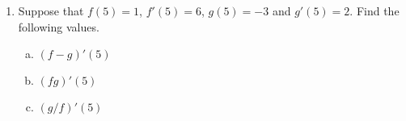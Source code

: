 \documentclass[11pt,fleqn]{article}
\begin{document}
\begin{enumerate}
\begin{flushleft}
  \end{flushleft}
  
\item Suppose that $f(5) = 1$, $f'(5) = 6$, $g(5) = -3$
and $g'(5) = 2$. Find the following values. 


  \begin{multicols}{3}{
      \vspace*{-0.45in}
      \begin{enumerate}[(a)]
      \item $(f - g)'(5)$
      \item $(fg)'(5)$
      \item $(g/f)'(5)$
      \end{enumerate}}
  \end{multicols}
\vskip1in
\end{enumerate}
\end{document}
